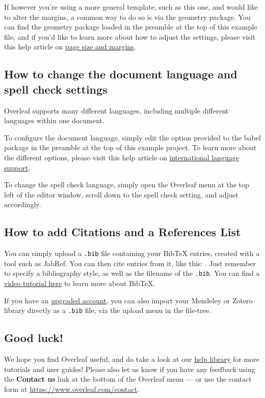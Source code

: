 \documentclass{article}
\begin{document}
	If however you're using a more general template, such as this one, and would
	like to alter the margins, a common way to do so is via the geometry package.
	You can find the geometry package loaded in the preamble at the top of this
	example file, and if you'd like to learn more about how to adjust the settings,
	please visit this help article on
	\href{https://www.overleaf.com/learn/latex/page_size_and_margins}{page size
	and margins}.

	\subsection{How to change the document language and spell check settings}

	Overleaf supports many different languages, including multiple different
	languages within one document.

	To configure the document language, simply edit the option provided to the babel
	package in the preamble at the top of this example project. To learn more
	about the different options, please visit this help article on \href{https://www.overleaf.com/learn/latex/International_language_support}{international
	language support}.

	To change the spell check language, simply open the Overleaf menu at the top
	left of the editor window, scroll down to the spell check setting, and
	adjust accordingly.

	\subsection{How to add Citations and a References List}

	You can simply upload a \verb|.bib| file containing your BibTeX entries,
	created with a tool such as JabRef. You can then cite entries from it, like
	this: \cite{greenwade93}. Just remember to specify a bibliography style, as well
	as the filename of the \verb|.bib|. You can find a
	\href{https://www.overleaf.com/help/97-how-to-include-a-bibliography-using-bibtex}{video
	tutorial here}
	to learn more about BibTeX.

	If you have an
	\href{https://www.overleaf.com/user/subscription/plans}{upgraded account}, you
	can also import your Mendeley or Zotero library directly as a \verb|.bib| file,
	via the upload menu in the file-tree.

	\subsection{Good luck!}

	We hope you find Overleaf useful, and do take a look at our
	\href{https://www.overleaf.com/learn}{help library} for more tutorials and
	user guides! Please also let us know if you have any feedback using the \textbf{Contact
	us} link at the bottom of the Overleaf menu --- or use the contact form at
	\url{https://www.overleaf.com/contact}.

	
	
\end{document}
